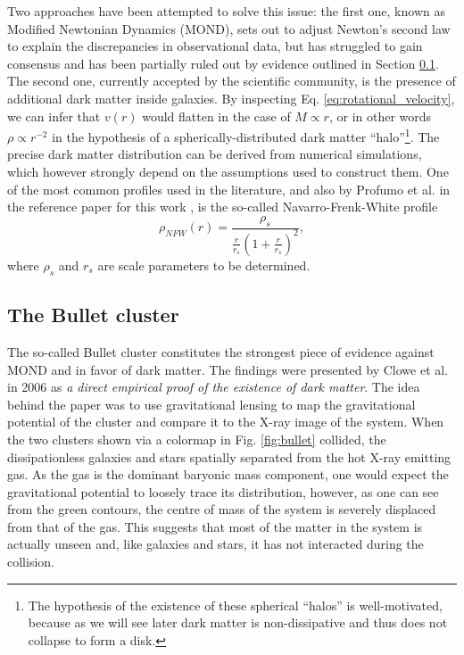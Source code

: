 Two approaches have been attempted to solve this issue: the first one, known as Modified Newtonian Dynamics (MOND), sets out to adjust Newton's second law to explain the discrepancies in observational data, but has struggled to gain consensus and has been partially ruled out by evidence outlined in Section \ref{sec:bullet}. The second one, currently accepted by the scientific community, is the presence of additional dark matter inside galaxies.
By inspecting Eq. \eqref{eq:rotational_velocity}, we can infer that \(v(r)\) would flatten in the case of \(M \propto r\), or in other words \(\rho \propto r^{-2} \) in the hypothesis of a spherically-distributed dark matter ``halo''\footnote{The hypothesis of the existence of these spherical ``halos'' is well-motivated, because as we will see later dark matter is non-dissipative and thus does not collapse to form a disk.}. The precise dark matter distribution can be derived from numerical simulations, which however strongly depend on the assumptions used to construct them. One of the most common profiles used in the literature, and also by Profumo et al. in the reference paper for this work \cite{Profumo_2018}, is the so-called Navarro-Frenk-White profile
\begin{equation}
	\rho_{NFW} (r) = \frac{\rho _s}{\frac{r}{r_s}\left( 1+ \frac{r}{r_s} \right)^2 },
\end{equation}
where \(\rho _s\) and \(r_s\) are scale parameters to be determined.

\subsection{The Bullet cluster}\label{sec:bullet}
The so-called Bullet cluster constitutes the strongest piece of evidence against MOND and in favor of dark matter. The findings were presented by Clowe et al. in 2006 \cite{Clowe_2006} as \emph{a direct empirical proof of the existence of dark matter}. The idea behind the paper was to use gravitational lensing to map the gravitational potential of the cluster and compare it to the X-ray image of the system. When the two clusters shown via a colormap in Fig. \ref{fig:bullet} collided, the dissipationless galaxies and stars spatially separated from the hot X-ray emitting gas. As the gas is the dominant baryonic mass component, one would expect the gravitational potential to loosely trace its distribution, however, as one can see from the green contours, the centre of mass of the system is severely displaced from that of the gas. This suggests that most of the matter in the system is actually unseen and, like galaxies and stars, it has not interacted during the collision.

